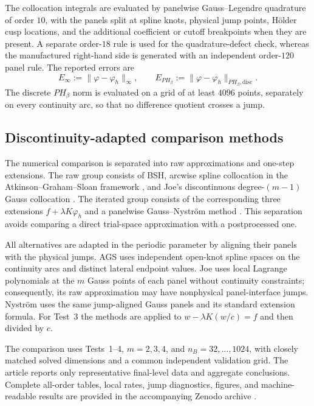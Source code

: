 \documentclass[11pt,a4paper]{amsart}
\theoremstyle{plain}
\theoremstyle{definition}
\theoremstyle{remark}
\begin{document}
The collocation integrals are evaluated by panelwise Gauss--Legendre
quadrature of order $10$, with the panels split at spline knots, physical
jump points, H\"older cusp locations, and the additional coefficient or
cutoff breakpoints when they are present.  A separate order-$18$ rule is used for the quadrature-defect
check, whereas the manufactured right-hand side is generated with an
independent order-$120$ panel rule.  The reported errors are
\[
 E_\infty:=\|\varphi-\varphi_h\|_\infty,
 \qquad
 E_{PH_\beta}:=\|\varphi-\varphi_h\|_{PH_\beta,\mathrm{disc}}.
\]
The discrete $PH_\beta$ norm is evaluated on a grid of at least $4096$
points, separately on every continuity arc, so that no difference quotient
crosses a jump.


\subsection{Discontinuity-adapted comparison methods}
\label{sec:alternative-comparison}

The numerical comparison is separated into raw approximations and one-step
extensions.  The raw group consists of BSH, arcwise spline collocation in the
Atkinson--Graham--Sloan framework \cite{AtkinsonGrahamSloan}, and Joe's
discontinuous degree-$(m-1)$ Gauss collocation \cite{Joe1985}.  The iterated
group consists of the corresponding three extensions
$f+\lambda K\varphi_h$ and a panelwise Gauss--Nystr\"om method
\cite{Atkinson,JoeDiscrete1985}.  This separation avoids comparing a direct
trial-space approximation with a postprocessed one.

All alternatives are adapted in the periodic parameter by aligning their
panels with the physical jumps.  AGS uses independent open-knot spline
spaces on the continuity arcs and distinct lateral endpoint values.  Joe
uses local Lagrange polynomials at the $m$ Gauss points of each panel without
continuity constraints; consequently, its raw approximation may have
nonphysical panel-interface jumps.  Nystr\"om uses the same jump-aligned
Gauss panels and its standard extension formula.  For Test~3 the methods are
applied to $w-\lambda K(w/c)=f$ and then divided by $c$.

The comparison uses Tests~1--4, $m=2,3,4$, and
$n_B=32,\ldots,1024$, with closely matched solved dimensions and a common
independent validation grid.  The article reports only representative
final-level data and aggregate conclusions.  Complete all-order tables,
local rates, jump diagnostics, figures, and machine-readable results are
provided in the accompanying Zenodo archive
\cite{CapceleaCapceleaSoftware2026}.
\end{document}
